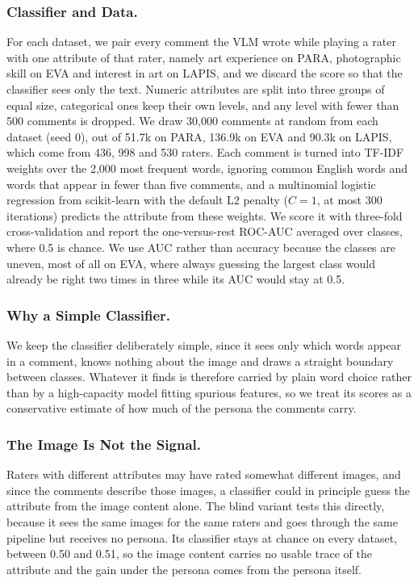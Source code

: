 \documentclass[runningheads]{llncs}
\begin{document}
\subsubsection{Classifier and Data.} For each dataset, we pair every comment the VLM wrote while playing a rater with one attribute of that rater, namely art experience on PARA, photographic skill on EVA and interest in art on LAPIS, and we discard the score so that the classifier sees only the text. Numeric attributes are split into three groups of equal size, categorical ones keep their own levels, and any level with fewer than 500 comments is dropped. We draw 30{,}000 comments at random from each dataset (seed 0), out of 51.7k on PARA, 136.9k on EVA and 90.3k on LAPIS, which come from 436, 998 and 530 raters. Each comment is turned into TF-IDF weights over the 2{,}000 most frequent words, ignoring common English words and words that appear in fewer than five comments, and a multinomial logistic regression from scikit-learn with the default L2 penalty ($C{=}1$, at most 300 iterations) predicts the attribute from these weights. We score it with three-fold cross-validation and report the one-versus-rest ROC-AUC averaged over classes, where 0.5 is chance. We use AUC rather than accuracy because the classes are uneven, most of all on EVA, where always guessing the largest class would already be right two times in three while its AUC would stay at 0.5.

\subsubsection{Why a Simple Classifier.} We keep the classifier deliberately simple, since it sees only which words appear in a comment, knows nothing about the image and draws a straight boundary between classes. Whatever it finds is therefore carried by plain word choice rather than by a high-capacity model fitting spurious features, so we treat its scores as a conservative estimate of how much of the persona the comments carry.

\subsubsection{The Image Is Not the Signal.} Raters with different attributes may have rated somewhat different images, and since the comments describe those images, a classifier could in principle guess the attribute from the image content alone. The blind variant tests this directly, because it sees the same images for the same raters and goes through the same pipeline but receives no persona. Its classifier stays at chance on every dataset, between 0.50 and 0.51, so the image content carries no usable trace of the attribute and the gain under the persona comes from the persona itself.
\end{document}
